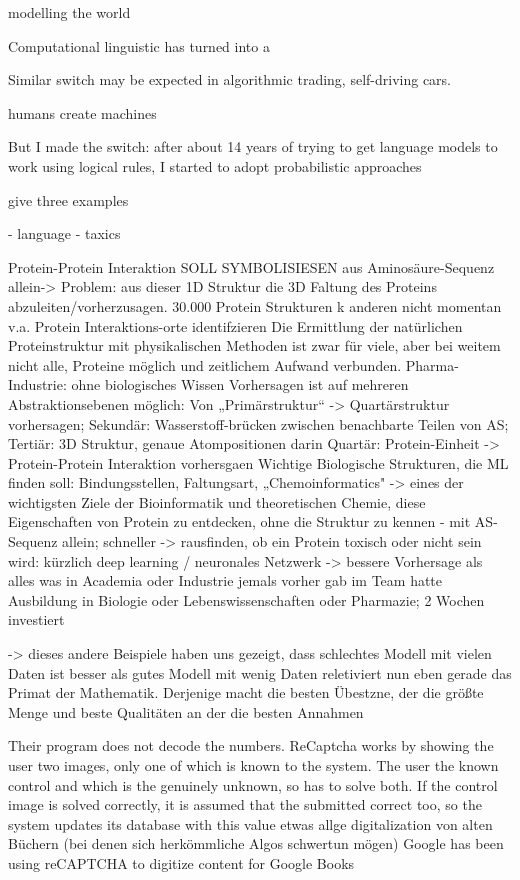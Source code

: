 \documentclass[authoryear,review,3p]{elsarticle}
\begin{document}
modelling the world

Computational linguistic has turned into a 


Similar switch may be expected in algorithmic trading, self-driving
cars.

humans create machines

But I made the switch: after about 14 years of trying to get language models to work using logical rules, I started to adopt probabilistic approaches


give three examples

- language
- taxics

Protein-Protein Interaktion
SOLL SYMBOLISIESEN
aus Aminosäure-Sequenz allein-> Problem: aus dieser 1D Struktur die 3D Faltung des Proteins abzuleiten/vorherzusagen. 30.000 Protein Strukturen k anderen nicht
momentan v.a. Protein Interaktions-orte identifzieren
Die Ermittlung der natürlichen Proteinstruktur mit physikalischen Methoden ist zwar für viele, aber bei weitem nicht alle, Proteine möglich und zeitlichem Aufwand verbunden.
Pharma-Industrie:
ohne biologisches Wissen
Vorhersagen ist auf mehreren Abstraktionsebenen möglich:
Von „Primärstruktur“ -> Quartärstruktur vorhersagen; Sekundär: Wasserstoff-brücken zwischen benachbarte Teilen von AS; Tertiär: 3D Struktur, genaue Atompositionen darin
Quartär: Protein-Einheit -> Protein-Protein Interaktion vorhersgaen
Wichtige Biologische Strukturen, die ML finden soll: Bindungsstellen, Faltungsart,
„Chemoinformatics"
-> eines der wichtigsten Ziele der Bioinformatik und theoretischen Chemie, diese Eigenschaften von Protein zu entdecken, ohne die Struktur zu kennen - mit AS-Sequenz allein; schneller -> rausfinden, ob ein Protein toxisch oder nicht sein wird: kürzlich deep learning / neuronales Netzwerk -> bessere Vorhersage als alles was in Academia oder Industrie jemals vorher gab im Team hatte Ausbildung in Biologie oder Lebenswissenschaften oder Pharmazie; 2 Wochen investiert


-> dieses andere Beispiele haben uns gezeigt, dass
schlechtes Modell mit vielen Daten ist besser als gutes Modell mit wenig Daten
reletiviert nun eben gerade das Primat der Mathematik. Derjenige macht die besten Übestzne, der die größte Menge und beste Qualitäten an der die besten Annahmen



Their program does not decode the numbers. ReCaptcha works by showing the user two images, only one of which is known to the system. The user the known control and which is the genuinely unknown, so has to solve both. If the control image is solved correctly, it is assumed that the submitted correct too, so the system updates its database with this value
etwas allge
digitalization von alten Büchern (bei denen sich herkömmliche Algos schwertun mögen)
Google has been using reCAPTCHA to digitize content for Google Books
\end{document}
